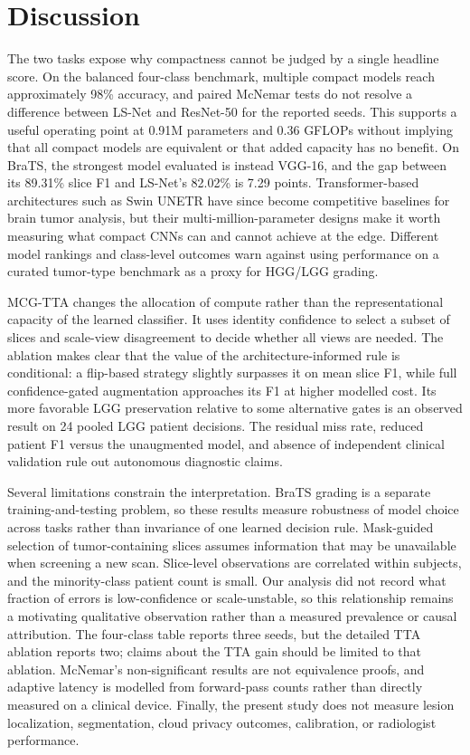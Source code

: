 \section{Discussion}
The two tasks expose why compactness cannot be judged by a single headline score. On the balanced four-class benchmark, multiple compact models reach approximately 98\% accuracy, and paired McNemar tests do not resolve a difference between LS-Net and ResNet-50 for the reported seeds. This supports a useful operating point at 0.91M parameters and 0.36 GFLOPs without implying that all compact models are equivalent or that added capacity has no benefit. On BraTS, the strongest model evaluated is instead VGG-16, and the gap between its 89.31\% slice F1 and LS-Net's 82.02\% is 7.29 points. Transformer-based architectures such as Swin UNETR \cite{hatamizadeh2022} have since become competitive baselines for brain tumor analysis, but their multi-million-parameter designs make it worth measuring what compact CNNs can and cannot achieve at the edge. Different model rankings and class-level outcomes warn against using performance on a curated tumor-type benchmark as a proxy for HGG/LGG grading.

MCG-TTA changes the allocation of compute rather than the representational capacity of the learned classifier. It uses identity confidence to select a subset of slices and scale-view disagreement to decide whether all views are needed. The ablation makes clear that the value of the architecture-informed rule is conditional: a flip-based strategy slightly surpasses it on mean slice F1, while full confidence-gated augmentation approaches its F1 at higher modelled cost. Its more favorable LGG preservation relative to some alternative gates is an observed result on 24 pooled LGG patient decisions. The residual miss rate, reduced patient F1 versus the unaugmented model, and absence of independent clinical validation rule out autonomous diagnostic claims.

Several limitations constrain the interpretation. BraTS grading is a separate training-and-testing problem, so these results measure robustness of model choice across tasks rather than invariance of one learned decision rule. Mask-guided selection of tumor-containing slices assumes information that may be unavailable when screening a new scan. Slice-level observations are correlated within subjects, and the minority-class patient count is small. Our analysis did not record what fraction of errors is low-confidence or scale-unstable, so this relationship remains a motivating qualitative observation rather than a measured prevalence or causal attribution. The four-class table reports three seeds, but the detailed TTA ablation reports two; claims about the TTA gain should be limited to that ablation. McNemar's non-significant results are not equivalence proofs, and adaptive latency is modelled from forward-pass counts rather than directly measured on a clinical device. Finally, the present study does not measure lesion localization, segmentation, cloud privacy outcomes, calibration, or radiologist performance.

